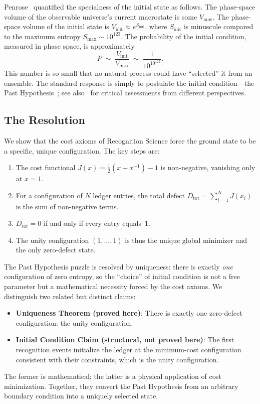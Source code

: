 \documentclass[12pt,a4paper]{article}
\theoremstyle{definition}
\theoremstyle{remark}
\begin{document}
Penrose~\cite{Penrose1989} quantified the specialness of the initial state
as follows.  The phase-space volume of the observable universe's current
macrostate is some $V_{\mathrm{now}}$.  The phase-space volume of the
initial state is $V_{\mathrm{init}} \approx e^{S_{\mathrm{init}}}$, where
$S_{\mathrm{init}}$ is minuscule compared to the maximum entropy
$S_{\mathrm{max}} \sim 10^{123}$.  The probability of the initial
condition, measured in phase space, is approximately
\[
  P \;\sim\; \frac{V_{\mathrm{init}}}{V_{\mathrm{max}}}
  \;\sim\; \frac{1}{10^{10^{123}}}.
\]
This number is so small that no natural process could have ``selected'' it
from an ensemble.  The standard response is simply to postulate the initial
condition---the Past Hypothesis~\cite{Albert2000}; see
also~\cite{Carroll2010,Earman2006,Callender2004} for critical
assessments from different perspectives.

\subsection{The Resolution}

We show that the cost axioms of Recognition Science force the ground
state to be a specific, unique configuration.  The key steps are:

\begin{enumerate}
  \item The cost functional $J(x) = \tfrac{1}{2}(x + x^{-1}) - 1$ is
  non-negative, vanishing only at $x = 1$.
  \item For a configuration of $N$ ledger entries, the total defect
  $D_{\mathrm{tot}} = \sum_{i=1}^{N} J(x_i)$ is the sum of non-negative
  terms.
  \item $D_{\mathrm{tot}} = 0$ if and only if every entry equals~1.
  \item The unity configuration $(1, \ldots, 1)$ is thus the unique
  global minimizer and the only zero-defect state.
\end{enumerate}

The Past Hypothesis puzzle is resolved by uniqueness: there is exactly
\emph{one} configuration of zero entropy, so the ``choice'' of initial
condition is not a free parameter but a mathematical necessity forced by
the cost axioms.  We distinguish two related but distinct claims:
\begin{itemize}[nosep]
  \item \textbf{Uniqueness Theorem (proved here)}: There is exactly one
  zero-defect configuration: the unity configuration.
  \item \textbf{Initial Condition Claim (structural, not proved here)}:
  The first recognition events initialize the ledger at the
  minimum-cost configuration consistent with their constraints, which is
  the unity configuration.
\end{itemize}
The former is mathematical; the latter is a physical application of cost
minimization.  Together, they convert the Past Hypothesis from an
arbitrary boundary condition into a uniquely selected state.
\end{document}
